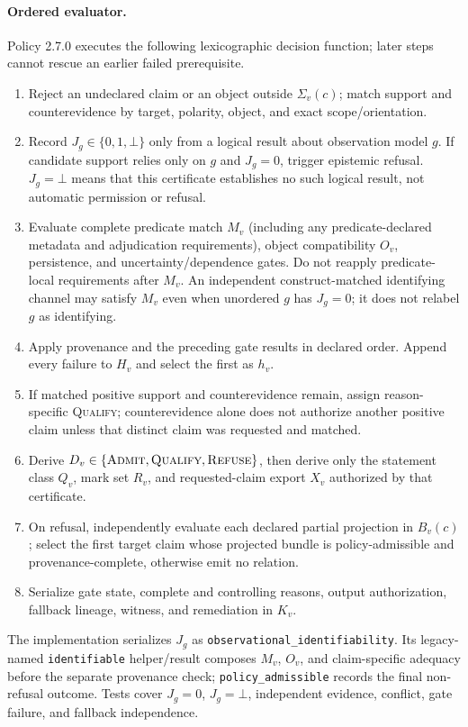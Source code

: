 \documentclass[manuscript,screen,review,anonymous]{acmart}
\begin{document}
\paragraph{Ordered evaluator.} Policy 2.7.0 executes the following lexicographic decision function; later steps cannot rescue an earlier failed prerequisite.
\begin{enumerate}
  \item Reject an undeclared claim or an object outside $\Sigma_v(c)$; match support and counterevidence by target, polarity, object, and exact scope/orientation.
  \item Record $J_g\in\{0,1,\bot\}$ only from a logical result about observation model $g$. If candidate support relies only on $g$ and $J_g=0$, trigger epistemic refusal. $J_g=\bot$ means that this certificate establishes no such logical result, not automatic permission or refusal.
  \item Evaluate complete predicate match $M_v$ (including any predicate-declared metadata and adjudication requirements), object compatibility $O_v$, persistence, and uncertainty/dependence gates. Do not reapply predicate-local requirements after $M_v$. An independent construct-matched identifying channel may satisfy $M_v$ even when unordered $g$ has $J_g=0$; it does not relabel $g$ as identifying.
  \item Apply provenance and the preceding gate results in declared order. Append every failure to $H_v$ and select the first as $h_v$.
  \item If matched positive support and counterevidence remain, assign reason-specific \textsc{Qualify}; counterevidence alone does not authorize another positive claim unless that distinct claim was requested and matched.
  \item Derive $D_v\in\{\textsc{Admit},\textsc{Qualify},\textsc{Refuse}\}$, then derive only the statement class $Q_v$, mark set $R_v$, and requested-claim export $X_v$ authorized by that certificate.
  \item On refusal, independently evaluate each declared partial projection in $B_v(c)$; select the first target claim whose projected bundle is policy-admissible and provenance-complete, otherwise emit no relation.
  \item Serialize gate state, complete and controlling reasons, output authorization, fallback lineage, witness, and remediation in $K_v$.
\end{enumerate}
The implementation serializes $J_g$ as \texttt{observational\_identifiability}. Its legacy-named \texttt{identifiable} helper/result composes $M_v$, $O_v$, and claim-specific adequacy before the separate provenance check; \texttt{policy\_admissible} records the final non-refusal outcome. Tests cover $J_g=0$, $J_g=\bot$, independent evidence, conflict, gate failure, and fallback independence.
\end{document}
